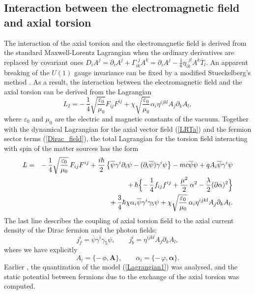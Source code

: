 \documentclass[12pt,prd,showkeys,amsmath,amssymb,nofootinbib]{revtex4-1}
\begin{document}
\subsection{Interaction between the electromagnetic field and axial torsion}


The interaction of the axial torsion and the electromagnetic field is derived from the standard Maxwell-Lorentz Lagrangian when the ordinary derivatives are replaced by covariant ones $D_iA^j=\partial_iA^j+\Gamma_{ik}^{\ \ j}A^k=\partial_iA^j-\frac{1}{6}\eta_{ik}^{\ \ jl}A^k\overline{T}_{l}$. An apparent breaking of the $U(1)$ gauge invariance can be fixed by a modified Stueckelberg's method \cite{Stueckelberg}. As a result, the interaction between the electromagnetic field and the axial torsion can be derived from the Lagrangian
\begin{equation}
L_I = -\,{\frac{1}{4}}\sqrt{\frac{\varepsilon_0}{\mu_0}}F_{ij}F^{ij}
+ \chi\sqrt{\frac{\varepsilon_0}{\mu_0}}\alpha_i\eta^{ijkl}A_j\partial_kA_l,
\end{equation}
where $\varepsilon_0$ and $\mu_0$ are the electric and magnetic constants of the vacuum. Together with the dynamical Lagrangian for the axial vector field (\ref{LRTa}) and the fermion sector terms (\ref{Dirac_field}), the total Lagrangian for the torsion field interacting with spin of the matter sources has the form
\begin{eqnarray}
L &=& -\,\frac{1}{4}\sqrt{\frac {\varepsilon_0}{\mu_0}}\,F_{ij}F^{ij} + \frac{i\hbar}{2}\left\{
\overline{\psi}\gamma^i\partial_i\psi - (\partial_i\overline{\psi})\gamma^i\psi\right\}
- mc\overline{\psi}\psi + qA_i\overline{\psi}\gamma^i\psi \nonumber\\
&& +\,\hbar\Bigl\{-\,{\frac 14}f_{ij}f^{ij} + {\frac {\mu^2}2}\,\alpha^2 - {\frac \lambda 2}
(\partial\alpha)^2\Bigr\} \nonumber\\
&& + \,{\frac 34}\hbar\chi\alpha_i\overline{\psi}\gamma^i\gamma_5\psi +
\chi\sqrt{\frac {\varepsilon_0}{\mu_0}}\,\alpha_i\eta^{ijkl}A_j\partial_kA_l.\label{Lagrangian1}
\end{eqnarray}
The last line describes the coupling of axial torsion field to the axial current density of the Dirac fermion and the photon fields:
\begin{equation}\label{current}
j^i_f = \overline{\psi}\gamma^i\gamma_5\psi,\qquad j^i_b = \eta^{ijkl}A_j\partial_kA_l,
\end{equation}
where we have explicitly
\begin{equation}\label{AA}
A_i = \{-\,\phi, \bm{A}\}, \qquad \alpha_i = \{-\,\varphi, \bm{\alpha}\}.
\end{equation}
Earlier \cite{Yakushin}, the quantization of the model (\ref{Lagrangian1}) was analysed, and the static potential between fermions due to the exchange of the axial torsion was computed. 
 
\end{document}
